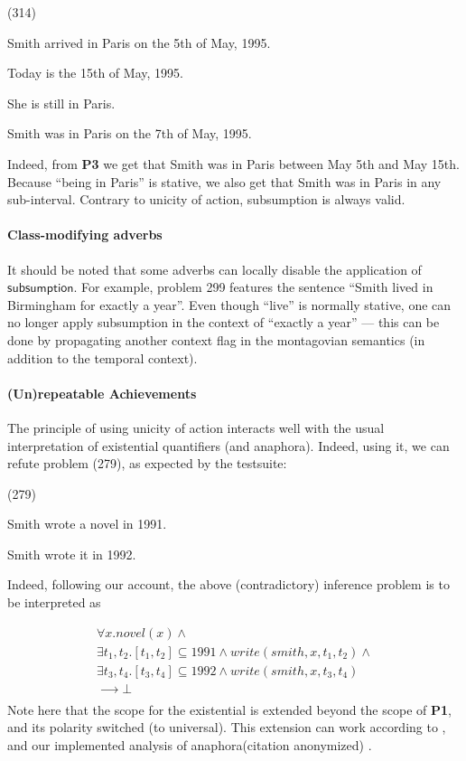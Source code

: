 \documentclass[a4paper,11pt]{article}
\newcommand\hyp{\item[H]}
\newcommand\fracasex[2]{\begin{lingex}\item[(#1)] \begin{subex} #2 \end{subex} \end{lingex} }
\newcommand\constant[1]{\mathsf{#1}}
\begin{document}
\fracasex{314}
{\item	Smith arrived in Paris on the 5th of May, 1995.
\item	Today is the 15th of May, 1995.
\item	She is still in Paris.
\hyp 	Smith was in Paris on the 7th of May, 1995.
}

Indeed, from \textbf{P3} we get that Smith was in Paris between May
5th and May 15th. Because ``being in Paris'' is stative, we also get that
Smith was in Paris in any sub-interval. Contrary to unicity of action,
subsumption is always valid.

\paragraph{Class-modifying adverbs}
It should be noted that some adverbs can locally disable the
application of $\constant {subsumption}$. For example, problem 299
features the sentence ``Smith lived in Birmingham for exactly a
year''.  Even though ``live'' is normally stative, one can no longer
apply subsumption in the context of ``exactly a year'' --- this can be
done by propagating another context flag in the montagovian semantics
(in addition to the temporal context).

\paragraph{(Un)repeatable Achievements}
\label{sec:repeatable-achievements}
The principle of using unicity of action interacts well with the usual
interpretation of existential quantifiers (and anaphora).  Indeed, using it, we
can refute problem (279), as expected by the testsuite:

\fracasex{279}{
\item	Smith wrote a novel in 1991.
\hyp 	 Smith wrote it in 1992.
}
Indeed, following our account, the above (contradictory) inference problem is to be
interpreted as

\begin{equation}
  \label{eq:smith-novel-1}
\begin{array}{l}
∀x. novel(x) ∧ \\
∃t_1,t_2. [t_1,t_2] ⊆ 1991 ∧ write(smith,x,t_1,t_2) ∧ \\
∃t_3,t_4. [t_3,t_4] ⊆ 1992 ∧ write(smith,x,t_3,t_4) \\
⟶ ⊥ \\
\end{array}
\end{equation}
Note here that the scope for the existential is extended beyond the
scope of \textbf{P1}, and its polarity switched (to universal). This extension can work according to
\citet{unger_dynamic_2011}, and our implemented analysis of
anaphora\ifanon (citation anonymized)
\else\citep{bernardy_computational_2018,bernardy_wide-coverage_2019}\fi.
\end{document}

